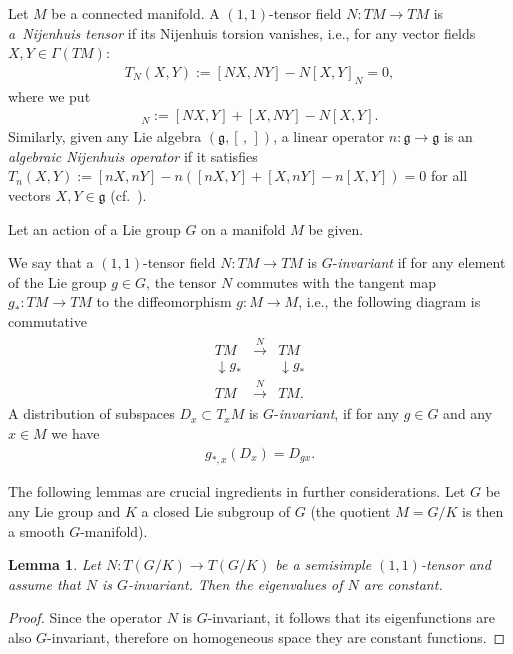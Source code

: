 \documentclass[10pt,a4paper]{amsart}
\numberwithin{equation}{section}
\newtheorem{Lemma}[Theorem]{Lemma}
\begin{document}
\begin{Definition}\label{nijdef}Let $M$ be a connected manifold. A $(1,1)$-tensor field $N\colon TM\to TM$ is \emph{a~Nijenhuis tensor} if its Nijenhuis torsion vanishes,
i.e., for any vector fields $X,Y\in \Gamma(TM)$:
\begin{gather*}
 T_N(X,Y):=[NX,NY]-N [X,Y]_N=0,
\end{gather*}
where we put
\begin{gather*}
[X,Y]_N:=[NX,Y]+[X,NY]-N[X,Y].
\end{gather*}
Similarly, given any Lie algebra $(\mathfrak{g}, [\,,\,])$, a linear operator $n\colon \mathfrak{g}\to\mathfrak{g}$ is an \emph{algebraic Nijenhuis operator} if it satisfies
$T_n(X,Y):=[nX,nY]-n ( [nX,Y] + [X,nY] - n[X,Y] )=0$ for all vectors $X,Y\in \mathfrak{g}$ (cf.~\cite{golsok2000,mks}).
\end{Definition}

Let an action of a Lie group $G$ on a manifold $M$ be given.

\begin{Definition}\label{def2}We say that a $(1,1)$-tensor field $N\colon TM\to TM$ is $G$-\emph{invariant} if for any element of the Lie group $ g\in G$, the tensor $N$ commutes with the tangent map $g_*\colon TM \to TM$ to the diffeomorphism $g\colon M\to M$, i.e., the following diagram is commutative
\begin{gather*}
\begin{matrix}
TM & \stackrel{N}{\longrightarrow}& TM \\
\downarrow g_*& & \downarrow g_* \\
TM &\stackrel{N}{\longrightarrow}&TM .
\end{matrix}
\end{gather*}
A distribution of subspaces $D_x \subset T_xM$ is $G$-\emph{invariant}, if for any $g\in G$ and any $x\in M$ we have
\begin{gather*}
g_{*,x}(D_x)=D_{gx}.
\end{gather*}
\end{Definition}

The following lemmas are crucial ingredients in further considerations. Let $G$ be any Lie group and $K$ a closed Lie subgroup of $G$ (the quotient $M=G/K$ is then a smooth $G$-manifold).

\begin{Lemma}\label{L1}Let $N\colon T(G/K) \to T(G/K)$ be a semisimple $(1,1)$-tensor and assume that $N$ is $G$-invariant. Then the eigenvalues of $N$ are constant.
\end{Lemma}
\begin{proof}Since the operator $N$ is $G$-invariant, it follows that its eigenfunctions are also $G$-invariant, therefore on homogeneous space they are constant functions.
\end{proof}
\end{document}
